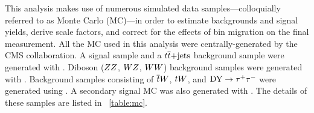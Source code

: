 This analysis makes use of numerous simulated data samples---colloquially
referred to as Monte Carlo (MC)---in order to estimate backgrounds and signal
yields, derive scale factors, and correct for the effects of bin migration on
the final measurement. All the MC used in this analysis were
centrally-generated by the CMS collaboration. A \DYtoll signal sample and a
$t\overline{t}\text{+jets}$ background sample were generated with \MADGRAPH
\cite{alwall2014}. Diboson ($ZZ$, $WZ$, $WW$) background samples were
generated with \PYTHIAsix \cite{sjostran2006}. Background samples consisting
of $\overline{t} W$, $t W$, and $\text{DY} \to \tau^{+} \tau^{-}$ were generated using \POWHEG
\cite{nason2004}\cite{alioli2010}\cite{re2011}. A secondary signal MC was also
generated with \POWHEG. The details of these samples are listed in
\TAB~\ref{table:mc}.



